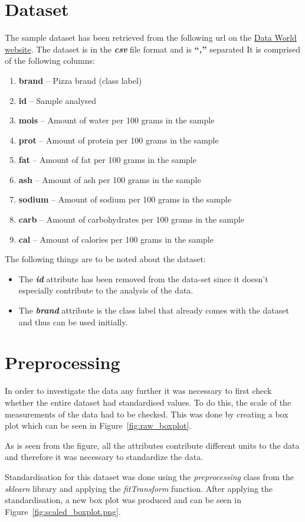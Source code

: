 \documentclass[preprint,12pt]{elsarticle}
\begin{document}
\section{Dataset}
\label{s:Dataset}
The sample dataset has been retrieved from the following url on the \href{https://data.world/sdhilip/pizza-datasets}{Data World website}. 
The dataset is in the \textbf{\textit{csv}} file format and is \textbf{``\textit{,}'' }separated It is comprised of the following columns:
\begin{enumerate}
\item \textbf{brand} -- Pizza brand (class label)
\item \textbf{id} -- Sample analysed
\item \textbf{mois} -- Amount of water per 100 grams in the sample
\item \textbf{prot} -- Amount of protein per 100 grams in the sample
\item \textbf{fat} -- Amount of fat per 100 grams in the sample
\item \textbf{ash} -- Amount of ash per 100 grams in the sample
\item \textbf{sodium} -- Amount of sodium per 100 grams in the sample
\item \textbf{carb} -- Amount of carbohydrates per 100 grams in the sample
\item \textbf{cal} -- Amount of calories per 100 grams in the sample
\end{enumerate}
\par
The following things are to be noted about the dataset:
\begin{itemize}
\item The \textbf{\textit{id}} attribute has been removed from the data-set since it doesn't  especially contribute to the analysis of the data.
\item The \textbf{\textit{brand}} attribute is the class label that already comes with the dataset and thus can be used initially.
\end{itemize}
\section{Preprocessing}
\label{ss:Preprocessing}
In order to investigate the data any further it was necessary to first check whether the entire dataset had standardised values. To do this, the
scale of the measurements of the data had to be checked. This was done by creating a box plot which can be seen in Figure~\ref{fig:raw_boxplot}.
\par
As is seen from the figure, all the attributes contribute different units to the data and therefore it was necessary to standardize the data.
\par
Standardisation for this dataset was done using the \textit{preprocessing} class from the \textit{sklearn} library \cite{scaling2020}  and applying the \textit{fitTransform} 
function. After applying the standardisation, a new box plot was produced and can be seen in Figure~\ref{fig:scaled_boxplot.png}. 
\end{document}
